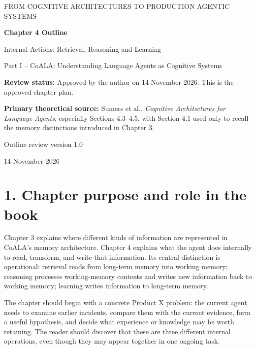 


\thispagestyle{empty}
\begin{center}
{\sffamily\Large\color{BookBlue} FROM COGNITIVE ARCHITECTURES TO PRODUCTION AGENTIC SYSTEMS\par}
\vspace{1.2cm}
{\sffamily\huge\bfseries\color{BookBlue} Chapter 4 Outline\par}
\vspace{0.45cm}
{\sffamily\LARGE Internal Actions: Retrieval, Reasoning and Learning\par}
\vspace{0.8cm}
{\large Part I -- CoALA: Understanding Language Agents as Cognitive Systems\par}
\vfill
\begin{learningbox}
\textbf{Review status:} Approved by the author on 14 November 2026. This is the approved chapter plan.

\textbf{Primary theoretical source:} Sumers et al., \emph{Cognitive Architectures for Language Agents}, especially Sections 4.3--4.5, with Section 4.1 used only to recall the memory distinctions introduced in Chapter 3.
\end{learningbox}
\vfill
{\sffamily\large Outline review version 1.0\par}
{\small 14 November 2026\par}
\end{center}
\clearpage
\section*{1. Chapter purpose and role in the book}
Chapter 3 explains where different kinds of information are represented in CoALA's memory architecture. Chapter 4 explains what the agent does internally to read, transform, and write that information. Its central distinction is operational: retrieval reads from long-term memory into working memory; reasoning processes working-memory contents and writes new information back to working memory; learning writes information to long-term memory.

The chapter should begin with a concrete Product X problem: the current agent needs to examine earlier incidents, compare them with the current evidence, form a useful hypothesis, and decide what experience or knowledge may be worth retaining. The reader should discover that these are three different internal operations, even though they may appear together in one ongoing task.


